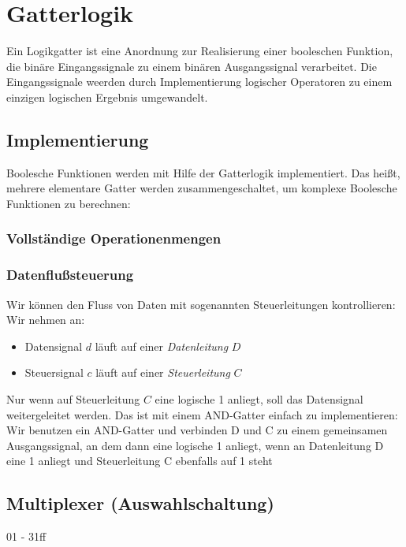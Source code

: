 \documentclass[12pt]{report}
\begin{document}
\section{Gatterlogik}
\begin{defbox}
  Ein Logikgatter ist eine Anordnung zur Realisierung einer booleschen Funktion, die binäre Eingangssignale zu einem binären Ausgangssignal verarbeitet.
  Die Eingangssignale weerden durch Implementierung logischer Operatoren zu einem einzigen logischen Ergebnis umgewandelt.
\end{defbox}

\subsection{Implementierung}
Boolesche Funktionen werden mit Hilfe der Gatterlogik implementiert. 
Das heißt, mehrere elementare Gatter werden zusammengeschaltet, um komplexe Boolesche Funktionen zu berechnen:

\subsubsection{Vollständige Operationenmengen}

\subsubsection{Datenflußsteuerung}
Wir können den Fluss von Daten mit sogenannten Steuerleitungen kontrollieren:
Wir nehmen an:
\begin{itemize}
  \item Datensignal $d$ läuft auf einer \textit{Datenleitung} $D$
  \item Steuersignal $c$ läuft auf einer \textit{Steuerleitung} $C$
\end{itemize}

Nur wenn auf Steuerleitung $C$ eine logische 1 anliegt, soll das Datensignal weitergeleitet werden.
Das ist mit einem AND-Gatter einfach zu implementieren: 
Wir benutzen ein AND-Gatter und verbinden D und C zu einem gemeinsamen Ausgangssignal, 
an dem dann eine logische 1 anliegt, wenn an Datenleitung D eine 1 anliegt und Steuerleitung C 
ebenfalls auf 1 steht

\subsection{Multiplexer (Auswahlschaltung)}
01 - 31ff
\end{document}
